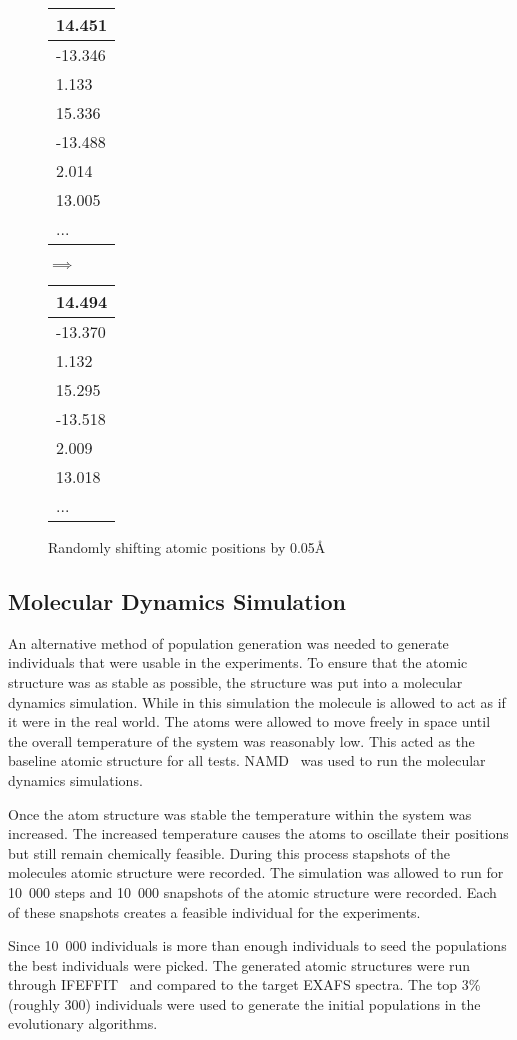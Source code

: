 \begin{figure}
	\centering
	\begin{tabular}{ | l | }
		\hline
		14.451 \\ \hline
		-13.346 \\ \hline
		1.133 \\ \hline
		15.336 \\ \hline
		-13.488 \\ \hline
		2.014 \\ \hline
		13.005 \\ \hline
		... \\ \hline
	\end{tabular}
	\qquad$\implies$\qquad
	\begin{tabular}{ | l | }
		\hline
		14.494 \\ \hline
		-13.370 \\ \hline
		1.132 \\ \hline
		15.295 \\ \hline
		-13.518 \\ \hline
		2.009 \\ \hline
		13.018 \\ \hline
		... \\ \hline
	\end{tabular}
	\caption{Randomly shifting atomic positions by 0.05\AA}
	\label{fig:random-shift}
\end{figure}

\subsection{Molecular Dynamics Simulation}

An alternative method of population generation was needed to generate individuals that were usable in the experiments. To ensure that the atomic structure was as stable as possible, the structure was put into a molecular dynamics simulation. While in this simulation the molecule is allowed to act as if it were in the real world. The atoms were allowed to move freely in space until the overall temperature of the system was reasonably low. This acted as the baseline atomic structure for all tests. NAMD~\cite{namd} was used to run the molecular dynamics simulations.

Once the atom structure was stable the temperature within the system was increased. The increased temperature causes the atoms to oscillate their positions but still remain chemically feasible. During this process stapshots of the molecules atomic structure were recorded. The simulation was allowed to run for 10\ 000 steps and 10\ 000 snapshots of the atomic structure were recorded. Each of these snapshots creates a feasible individual for the experiments.

Since 10\ 000 individuals is more than enough individuals to seed the populations the best individuals were picked. The generated atomic structures were run through IFEFFIT~\cite{ifeffit} and compared to the target EXAFS spectra. The top 3\% (roughly 300) individuals were used to generate the initial populations in the evolutionary algorithms.